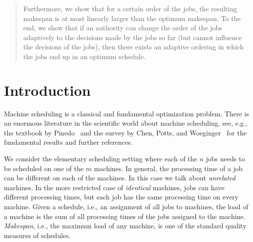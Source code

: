 \documentclass[12pt,a4paper]{article}
\theoremstyle{definition}
\theoremstyle{remark}
\begin{document}
\begin{abstract}
	Furthermore, we show that for a certain order of the jobs, the resulting makespan is at most linearly larger than the optimum makespan.
	To the end, we show that if an authority can change the order of the jobs adaptively to the decisions made by the jobs so far (but cannot influence the decisions of the jobs), then there exists an adaptive ordering in which the jobs end up in an optimum schedule.
%	
\end{abstract}

%
\section{Introduction}\label{sec:intro}

Machine scheduling is a classical and fundamental optimization problem. There is an enormous literature in the scientific world about machine scheduling, see, e.g., the textbook by Pinedo~\cite{Pinedo/2012} and the survey by Chen, Potts, and Woeginger~\cite{Chen+Potts+Woeginger/1999} for the fundamental results and further references.

We consider the elementary scheduling setting where each of the $n$ jobs needs to be scheduled on one of the $m$ machines. 
%
In general, the processing time of a job can be different on each of the machines. In this case we talk about \emph{unrelated} machines. In the more restricted case of \emph{identical} machines, jobs can have different processing times, but each job has the same processing time on every machine.
%
Given a schedule, i.e., an assignment of all jobs to machines, the load of a machine is the sum of all processing times of the jobs assigned to the machine. 
%
\emph{Makespan}, i.e., the maximum load of any machine, is one of the standard quality measures of schedules. 
%
\end{document}
